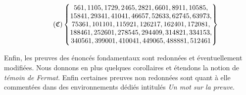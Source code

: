 \begin{equation}\tag{$\mathfrak{C}$}\label{liste-carmichael}
	\begin{Bmatrix}
		561,1105,1729,2465,2821,6601,8911,10585, \\
		15841, 29341, 41041, 46657, 52633, 62745, 63973, \\
		75361, 101101, 115921, 126217, 162401, 172081, \\
		188461, 252601, 278545, 294409, 314821, 334153, \\
		340561, 399001, 410041, 449065, 488881, 512461
	\end{Bmatrix}
\end{equation}


\vspace{1em}
Enfin, les preuves des énoncés fondamentaux sont redonnées et éventuellement modifiées. Nous donnons en plus quelques corollaires et étendons la notion de \emph{témoin de Fermat}. Enfin certaines preuves non redonnées sont quant à elle commentées dans des environnements dédiés intitulés \textit{Un mot sur la preuve}.
